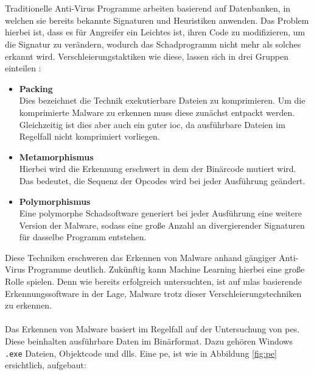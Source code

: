 \documentclass[
    12pt, %
    DIV10,
    ngerman, %
    a4paper, %
    oneside, %
    titlepage, %
    parskip=half, %
    headings=normal, %
    listof=totoc, %
    bibliography=totoc, %
    index=totoc, %
    captions=tableheading, %
    final %
]{scrreprt}
\begin{document}
\\\\
Traditionelle Anti-Virus Programme arbeiten basierend auf Datenbanken, in welchen sie bereits bekannte Signaturen und Heuristiken anwenden. Das Problem hierbei ist, dass es für Angreifer ein Leichtes ist, ihren Code zu modifizieren, um die Signatur zu verändern, wodurch das Schadprogramm nicht mehr als solches erkannt wird. Verschleierungstaktiken wie diese, lassen sich in drei Gruppen einteilen \parencite{he2017model}:
\begin{itemize}
\item \textbf{Packing}\\ Dies bezeichnet die Technik exekutierbare Dateien zu komprimieren. Um die komprimierte Malware zu erkennen muss diese zunächst entpackt werden. Gleichzeitig ist dies aber auch ein guter \ac{ioc}, da ausführbare Dateien im Regelfall nicht komprimiert vorliegen.
\item \textbf{Metamorphismus}\\ Hierbei wird die Erkennung erschwert in dem der Binärcode mutiert wird. Das bedeutet, die Sequenz der Opcodes wird bei jeder Ausführung geändert.
\item \textbf{Polymorphismus}\\ Eine polymorphe Schadsoftware generiert bei jeder Ausführung eine weitere Version der Malware, sodass eine gro{\ss}e Anzahl an divergierender Signaturen für dasselbe Programm entstehen.
\end{itemize}
Diese Techniken erschweren das Erkennen von Malware anhand gängiger Anti-Virus Programme deutlich. Zukünftig kann Machine Learning hierbei eine gro{\ss}e Rolle spielen. Denn wie \textcite{Han2019} bereits erfolgreich untersuchten, ist auf \ac{mlas} basierende Erkennungssoftware in der Lage, Malware trotz dieser Verschleierungstechniken zu erkennen.
\\\\
Das Erkennen von Malware basiert im Regelfall auf der Untersuchung von \ac{pes}. Diese beinhalten ausführbare Daten im Binärformat. Dazu gehören Windows \texttt{.exe} Dateien, Objektcode und \ac{dlls}. Eine \acs{pe}, ist wie in Abbildung \ref{fig:pe} ersichtlich, aufgebaut:
\end{document}
